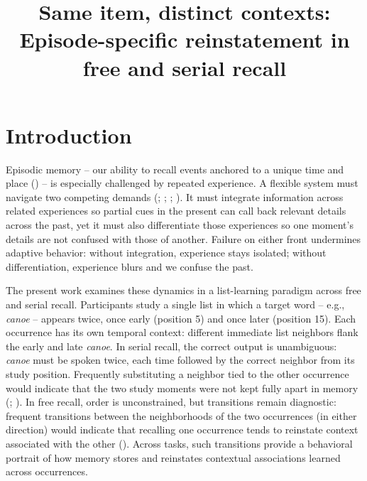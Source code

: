 \documentclass[
  man,
  floatsintext,
  longtable,
  nolmodern,
  notxfonts,
  notimes,
  draftfirst,
  colorlinks=true,linkcolor=blue,citecolor=blue,urlcolor=blue]{apa7}
\title{Same item, distinct contexts: Episode-specific reinstatement in
free and serial recall}
\begin{document}
\maketitle


\setcounter{secnumdepth}{-\maxdimen} %

\setlength\LTleft{0pt}


\section{Introduction}\label{introduction}

Episodic memory -- our ability to recall events anchored to a unique
time and place () -- is especially challenged by repeated experience. A flexible
system must navigate two competing demands
(;
;
;
). It must
integrate information across related experiences so partial cues in the
present can call back relevant details across the past, yet it must also
differentiate those experiences so one moment's details are not confused
with those of another. Failure on either front undermines adaptive
behavior: without integration, experience stays isolated; without
differentiation, experience blurs and we confuse the past.

The present work examines these dynamics in a list-learning paradigm
across free and serial recall. Participants study a single list in which
a target word -- e.g., \emph{canoe} -- appears twice, once early
(position 5) and once later (position 15). Each occurrence has its own
temporal context: different immediate list neighbors flank the early and
late \emph{canoe}. In serial recall, the correct output is unambiguous:
\emph{canoe} must be spoken twice, each time followed by the correct
neighbor from its study position. Frequently substituting a neighbor
tied to the other occurrence would indicate that the two study moments
were not kept fully apart in memory
(;
). In free
recall, order is unconstrained, but transitions remain diagnostic:
frequent transitions between the neighborhoods of the two occurrences
(in either direction) would indicate that recalling one occurrence tends
to reinstate context associated with the other
(). Across
tasks, such transitions provide a behavioral portrait of how memory
stores and reinstates contextual associations learned across
occurrences.
\end{document}
